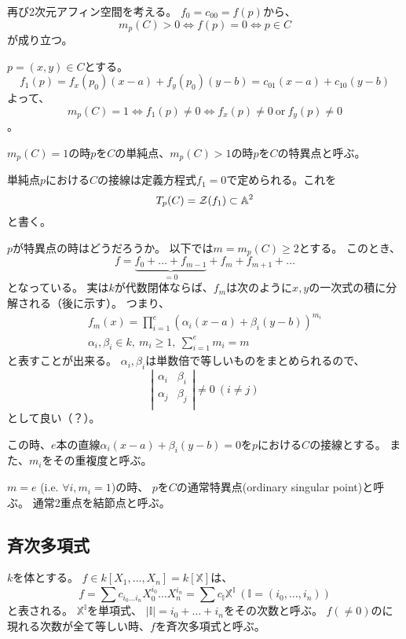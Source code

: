 \documentclass[a4paper]{jsarticle}
\begin{document}
    再び2次元アフィン空間を考える。
    $f_0=c_{00}=f(p)$から、
    \[ m_p(C)>0 \iff f(p)=0 \iff p \in C \]
    が成り立つ。

    $p=(x,y) \in C$とする。
    \[f_1(p)=f_x(p_0)(x-a)+f_y(p_0)(y-b)=c_{01}(x-a)+c_{10}(y-b)\]
    よって、
    \[ m_p(C)=1 \iff f_1(p) \neq 0 \iff f_x(p) \neq 0~\mathrm{or}~f_y(p) \neq 0 \]。

    \begin{Def}[単純点と特異点]
        $m_p(C)=1$の時$p$を$C$の単純点、$m_p(C) > 1$の時$p$を$C$の特異点と呼ぶ。
    \end{Def}
    単純点$p$における$C$の接線は定義方程式$f_1=0$で定められる。これを
    \[ T_p(C)=\mathcal{Z}(f_1) \subset \mathbb{A}^2 \]
    と書く。

    $p$が特異点の時はどうだろうか。
    以下では$m=m_p(C) \geq 2$とする。
    このとき、
    \[ f=\underbrace{f_0+\dots +f_{m-1}}_{=0}+f_m+f_{m+1}+\dots \]
    となっている。
    実は$k$が代数閉体ならば、$f_m$は次のように$x,y$の一次式の積に分解される（後に示す）。
    つまり、
    \begin{gather*}
        f_m(x)=\prod^{e}_{i=1} (\alpha_{i}(x-a)+\beta_{i}(y-b))^{m_{i}} \\
        \alpha_{i},\beta_{i} \in k,~ m_i \geq 1,~ \sum^e_{i=1}{m_i}=m
    \end{gather*}
    と表すことが出来る。
    $\alpha_i, \beta_i$は単数倍で等しいものをまとめられるので、
    \[
         \left|
        \begin{array}{cc}
            \alpha_i & \beta_i \\
            \alpha_j & \beta_j \\
        \end{array}
        \right|
        \neq 0
        ~(i \neq j)
    \]
    として良い（？）。

    この時、$e$本の直線$\alpha_{i}(x-a)+\beta_{i}(y-b)=0$を$p$における$C$の接線とする。
    また、$m_i$をその重複度と呼ぶ。

    \begin{Def}
        $m=e$ (i.e. $\forall i, m_i=1$)の時、
        $p$を$C$の通常特異点(ordinary singular point)と呼ぶ。
        通常2重点を結節点と呼ぶ。
    \end{Def}

    \subsection{斉次多項式}
    $k$を体とする。
    $f \in k[X_1, \dots, X_n]=k[\mathbb{X}]$は、
    \[
        f=\sum{c_{i_0 \dots i_n} X_0^{i_0} \dots X_n^{i_n}}
        =\sum{c_{\mathbb{I}} \mathbb{X}^{\mathbb{I}}} ~(\mathbb{I}=(i_0, \dots, i_n))
    \]
    と表される。
    $\mathbb{X}^{\mathbb{I}}$を単項式、
    $|\mathbb{I}|=i_0+\dots+i_n$をその次数と呼ぶ。
    $f(\neq 0)$のに現れる次数が全て等しい時、$f$を斉次多項式と呼ぶ。
\end{document}

